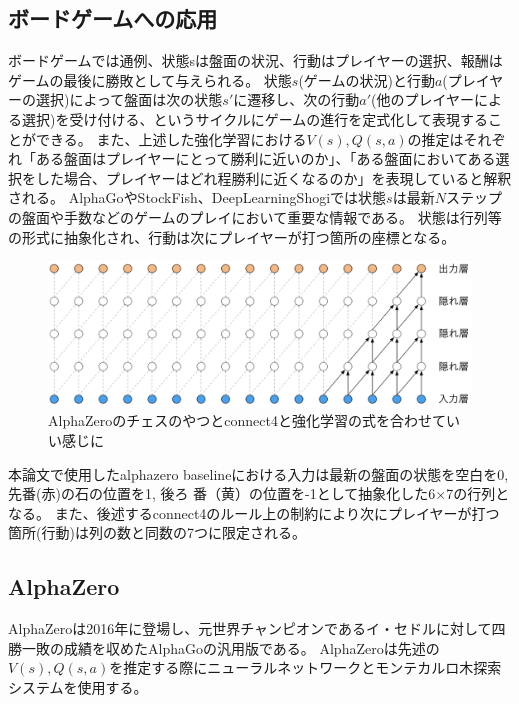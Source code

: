 \subsection{ボードゲームへの応用}
ボードゲームでは通例、状態sは盤面の状況、行動はプレイヤーの選択、報酬はゲームの最後に勝敗として与えられる。
状態$s$(ゲームの状況)と行動$a$(プレイヤーの選択)によって盤面は次の状態$s'$に遷移し、次の行動$a'$(他のプレイヤーによる選択)を受け付ける、というサイクルにゲームの進行を定式化して表現することができる。
また、上述した強化学習における$V(s),Q(s, a)$の推定はそれぞれ「ある盤面はプレイヤーにとって勝利に近いのか」、「ある盤面においてある選択をした場合、プレイヤーはどれ程勝利に近くなるのか」を表現していると解釈される。
AlphaGo\cite{}やStockFish\cite{StockFish}、DeepLearningShogi\cite{dlshogi}では状態$s$は最新$N$ステップの盤面や手数などのゲームのプレイにおいて重要な情報である。
状態は行列等の形式に抽象化され、行動は次にプレイヤーが打つ箇所の座標となる。
\begin{figure}[t]
	\centering
	\includegraphics[width=\linewidth]{./figure/ccl.png}
	\caption{AlphaZeroのチェスのやつとconnect4と強化学習の式を合わせていい感じに}
	\label{fig:ccl}
\end{figure}
本論文で使用したalphazero baselineにおける入力は最新の盤面の状態を空白を0, 先番(赤)の石の位置を1, 後ろ
番（黄）の位置を-1として抽象化した6$\times$7の行列となる。
また、後述するconnect4のルール上の制約により次にプレイヤーが打つ箇所(行動)は列の数と同数の7つに限定される。

\subsection{AlphaZero\cite{AlphaZero}}
AlphaZeroは2016年に登場し、元世界チャンピオンであるイ・セドルに対して四勝一敗の成績を収めたAlphaGoの汎用版である。
AlphaZeroは先述の$V(s),Q(s, a)$を推定する際にニューラルネットワークとモンテカルロ木探索システムを使用する。
